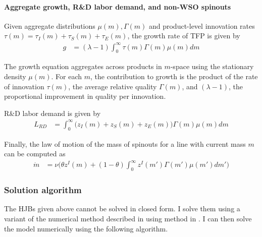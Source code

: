 \documentclass[12pt,english]{article}
\theoremstyle{remark}
\begin{document}
\paragraph{Aggregate growth, R\&D labor demand, and non-WSO spinouts}

Given aggregate distributions $\mu(m),\Gamma(m)$ and product-level innovation rates $\tau(m) = \tau_I(m) + \tau_S(m) + \tau_E(m)$, the growth rate of TFP is given by
\begin{align}
g &= (\lambda -1) \int_0^{\infty} \tau(m) \Gamma(m) \mu(m) dm 
\end{align}

The growth equation aggregates across products in $m$-space using the stationary density $\mu(m)$. For each $m$, the contribution to growth is the product of the rate of innovation $\tau(m)$, the average relative quality $\Gamma(m)$, and $(\lambda -1)$, the proportional improvement in quality per innovation.

R\&D labor demand is given by 
\begin{align*}
L_{RD} &= \int_0^{\infty} \big (z_I(m) + z_S(m) + z_E(m)\big)\Gamma(m)\mu(m) dm
\end{align*}

Finally, the law of motion of the mass of spinouts for a line with current mass $m$ can be computed as
\begin{align*}
	\dot{m} &= \nu \Big( \theta z^I(m) + (1-\theta) \int_0^{\infty} z^I(m') \Gamma(m') \mu(m') dm' \Big)
\end{align*}


\subsubsection{Solution algorithm}\label{solution_algorithm}

The HJBs given above cannot be solved in closed form. I solve them using a variant of the numerical method described in using method in \cite{achdou_income_2017}. I can then solve the model numerically using the following algorithm.
\end{document}
